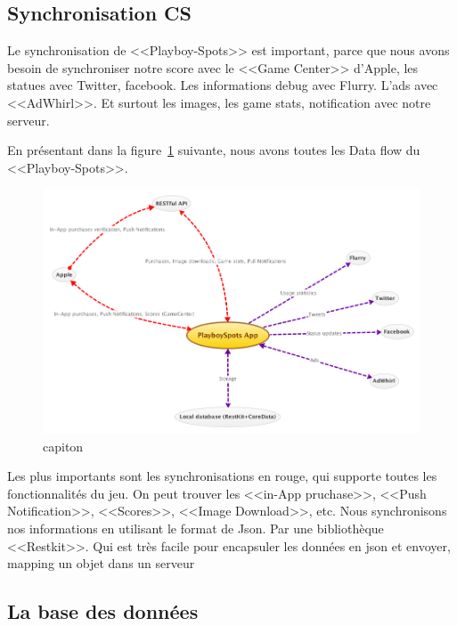 \subsection{Synchronisation CS} %

Le synchronisation de <<Playboy-Spots>> est important, parce que nous avons besoin de synchroniser notre score avec le <<Game Center>> d'Apple, les statues avec Twitter, facebook. Les informations debug avec Flurry. L'ads avec <<AdWhirl>>. Et surtout les images, les game stats, notification avec notre serveur.

En présentant dans la figure~\ref{fig:XMinds_DataFlow} suivante, nous avons toutes les Data flow du <<Playboy-Spots>>.

\begin{figure}[htbp]
	\centering
		\includegraphics[width=7in]{XMinds/DataFlow.png}
	\caption{capiton}
	\label{fig:XMinds_DataFlow}
\end{figure}

Les plus importants sont les synchronisations en rouge, qui supporte toutes les fonctionnalités du jeu. On peut trouver les <<in-App pruchase>>, <<Push Notification>>, <<Scores>>, <<Image Download>>, etc.
Nous synchronisons nos informations en utilisant le format de Json. Par une bibliothèque <<Restkit>>. Qui est très facile pour encapsuler les données en json et envoyer, mapping un objet dans un serveur  


\subsection{La base des données} %

